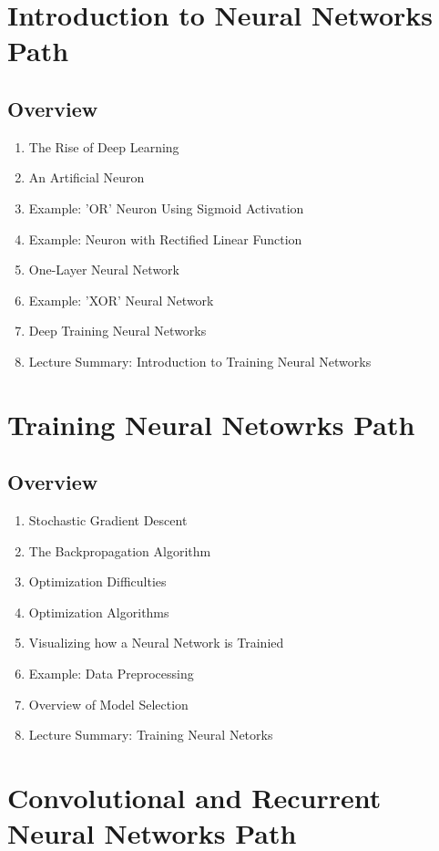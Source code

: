 \documentclass{article}
\begin{document}
\section{Introduction to Neural Networks Path}
\subsection{Overview}%
\label{sub:Overview}

\begin{enumerate}
    \item The Rise of Deep Learning
    \item An Artificial Neuron
    \item Example: 'OR' Neuron Using Sigmoid Activation
    \item Example: Neuron with Rectified Linear Function
    \item One-Layer Neural Network
    \item Example: 'XOR' Neural Network
    \item Deep Training Neural Networks
    \item Lecture Summary: Introduction to Training Neural Networks
\end{enumerate}

\section{Training Neural Netowrks Path}
\subsection{Overview}%
\label{sub:Overview}

\begin{enumerate}
    \item Stochastic Gradient Descent
    \item The Backpropagation Algorithm
    \item Optimization Difficulties
    \item Optimization Algorithms
    \item Visualizing how a Neural Network is Trainied
    \item Example: Data Preprocessing
    \item Overview of Model Selection
    \item Lecture Summary: Training Neural Netorks
\end{enumerate}

\section{Convolutional and Recurrent Neural Networks Path}
\end{document}

